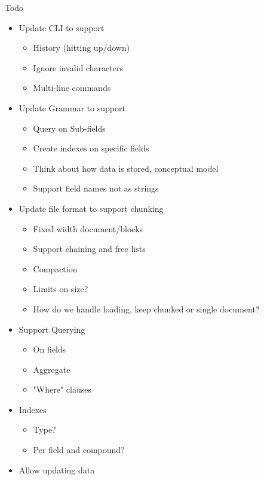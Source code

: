 \documentclass{article}
\begin{document}
Todo

\begin{itemize}

    \item   Update CLI to support
        \begin{itemize}
            \item    History (hitting up/down)
            \item    Ignore invalid characters
            \item    Multi-line commands
        \end{itemize}
    \item   Update Grammar to support
        \begin{itemize}
            \item    Query on Sub-fields
            \item    Create indexes on specific fields
            \item    Think about how data is stored, conceptual model
            \item    Support field names not as strings
        \end{itemize}
    \item   Update file format to support chunking
        \begin{itemize}
            \item   Fixed width document/blocks
            \item   Support chaining and free lists
            \item   Compaction
            \item   Limits on size?
            \item   How do we handle loading, keep chunked or single document?
        \end{itemize}
    \item   Support Querying
        \begin{itemize}
            \item    On fields
            \item    Aggregate
            \item    "Where" clauses
        \end{itemize}
    \item   Indexes
        \begin{itemize}
            \item    Type?
            \item    Per field and compound?
        \end{itemize}
    \item   Allow updating data

\end{itemize}
\end{document}
